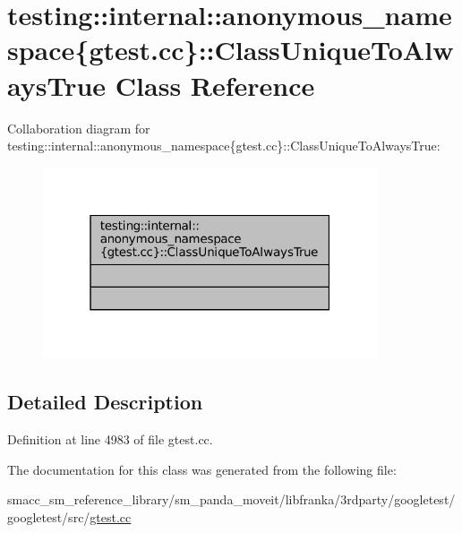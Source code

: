 \hypertarget{classtesting_1_1internal_1_1anonymous__namespace_02gtest_8cc_03_1_1ClassUniqueToAlwaysTrue}{}\section{testing\+:\+:internal\+:\+:anonymous\+\_\+namespace\{gtest.\+cc\}\+:\+:Class\+Unique\+To\+Always\+True Class Reference}
\label{classtesting_1_1internal_1_1anonymous__namespace_02gtest_8cc_03_1_1ClassUniqueToAlwaysTrue}


Collaboration diagram for testing\+:\+:internal\+:\+:anonymous\+\_\+namespace\{gtest.\+cc\}\+:\+:Class\+Unique\+To\+Always\+True\+:
\nopagebreak
\begin{figure}[H]
\begin{center}
\leavevmode
\includegraphics[width=280pt]{classtesting_1_1internal_1_1anonymous__namespace_02gtest_8cc_03_1_1ClassUniqueToAlwaysTrue__coll__graph}
\end{center}
\end{figure}


\subsection{Detailed Description}


Definition at line 4983 of file gtest.\+cc.



The documentation for this class was generated from the following file\+:\begin{DoxyCompactItemize}
\item 
smacc\+\_\+sm\+\_\+reference\+\_\+library/sm\+\_\+panda\+\_\+moveit/libfranka/3rdparty/googletest/googletest/src/\hyperlink{gtest_8cc}{gtest.\+cc}\end{DoxyCompactItemize}
